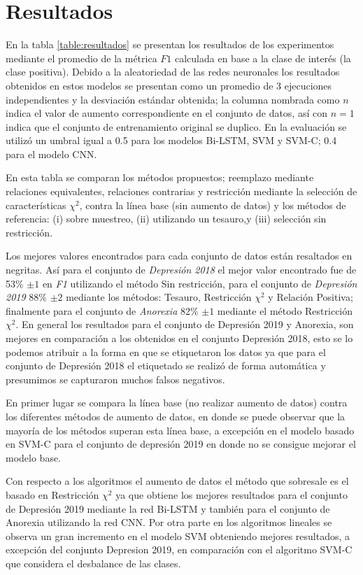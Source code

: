 \section{Resultados}

En la tabla \ref{table:resultados} se presentan los resultados de los experimentos mediante el promedio  de la métrica $F1$ calculada en base a la clase de interés (la clase positiva). Debido a la aleatoriedad de las redes neuronales los resultados obtenidos en estos modelos se presentan como un promedio de 3 ejecuciones independientes y la desviación estándar obtenida; la columna nombrada como $n$ indica el valor de aumento correspondiente en el conjunto de datos, así con $n=1$ indica que el conjunto de entrenamiento original se duplico. En la evaluación se utilizó un umbral igual a 0.5 para los modelos Bi-LSTM, SVM y SVM-C; 0.4 para el modelo CNN.

En esta tabla se comparan los métodos propuestos; reemplazo mediante relaciones equivalentes, relaciones contrarias y restricción mediante la selección de características $\chi^2$, contra la línea base (sin aumento de datos) y los métodos de referencia: (i) sobre muestreo, (ii) utilizando un tesauro,y (iii)  selección sin restricción.

Los mejores valores encontrados para cada conjunto de datos están resaltados en negritas. Así para el conjunto de \textit{Depresión 2018} el mejor valor encontrado fue de 53\% $\pm 1$  en \textit{F1} utilizando el método Sin restricción, para el conjunto de \textit{Depresión 2019} 88\% $\pm 2$ mediante los métodos: Tesauro, Restricción $\chi^2$ y Relación Positiva; finalmente para el conjunto de \textit{Anorexia} 82\% $\pm 1$ mediante el método Restricción $\chi^2$. En general los resultados para el conjunto de Depresión 2019 y Anorexia, son mejores en comparación a los obtenidos en el conjunto Depresión 2018, esto se lo podemos atribuir a la forma en que se etiquetaron los datos ya que para el conjunto de Depresión 2018 el etiquetado se realizó de forma automática y presumimos se capturaron muchos falsos negativos.

En primer lugar se compara la línea base (no realizar aumento de datos) contra los diferentes métodos de aumento de datos, en donde se puede observar que la mayoría de los métodos superan esta línea base, a excepción en el modelo basado en SVM-C para el conjunto de depresión 2019 en donde no se consigue mejorar el modelo base.

Con respecto a los algoritmos el aumento de datos el método que sobresale es el basado en Restricción $\chi^2$ ya que obtiene los mejores resultados para el conjunto de Depresión 2019 mediante la red Bi-LSTM y también para el conjunto de Anorexia utilizando la red CNN. Por otra parte en los algoritmos lineales se observa un gran incremento en el modelo SVM obteniendo mejores resultados, a excepción del conjunto Depresion 2019, en comparación con el algoritmo SVM-C que considera el desbalance de las clases. 







